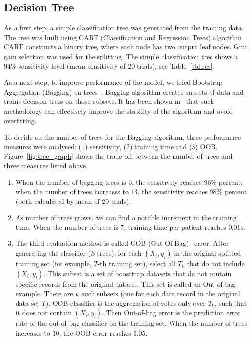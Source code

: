 \subsection{Decision Tree}
\label{sec:tree}

As a first step, a simple classification tree was generated from the 
training data. 
The tree was built using CART (Classification and Regression Trees) 
algorithm~\cite{CART}. 
CART constructs a binary tree, where each node has two output leaf 
nodes. 
Gini gain selection was used for the splitting. 
The simple classification tree shows a $94\%$ sensitivity level 
(mean sensitivity of 20 trials), see Table~\ref{tbl:res}.

As a next step, to improve performance of the model, we tried 
Bootstrap Aggregation (Bagging) on trees~\cite{BAGGING}. 
Bagging algorithm creates subsets of data and trains decision trees 
on those subsets. 
It has been shown in~\cite{BAGGING} that such methodology can 
effectively improve the stability of the algorithm and avoid 
overfitting.


To decide on the number of trees for the Bagging algorithm, three 
performance measures were analysed: (1) sensitivity, (2) training 
time and (3) OOB. Figure~\ref{fig:tree_graph} shows the trade-off 
between the number of trees and three measures listed above.

\begin{enumerate}
	\item When the number of bagging trees is $3$, the sensitivity 
	reaches $96\%$ percent; when 
	the number of trees increases to $13$, the sensitivity reaches 
	$98\%$ percent (both calculated by mean of 20 trials).
	\item 
	As number of trees grows, we can find a 
	notable increment in the training time. When the number of 
	trees is $7$, training time per patient reaches $0.01$s.
	\item The third evaluation method is called OOB 
	(Out-Of-Bag)~\cite{OOB} error. 
	After generating the classifier ($S$ trees), for each $(X_i, 
	y_i)$ in the original splitted training set (for example, $T$-th 
	training set), select all $T_k$ that do not include $(X_i, y_i)$. 
	This subset is a set of boosttrap datasets that do not contain 
	specific records from the original dataset. 
	This set is called an Out-of-bag example. 
	There are $n$ such subsets (one for each data record in the 
	original data set $T$). OOB classifier is the aggregation of 
	votes only over $T_k$, such that it does not contain $(X_i,y_i)$. 
	Then Out-of-bag error is the prediction error rate of the 
	out-of-bag classifier on the training 
	set. When the number of trees increases to $10$, the OOB error 
	reaches $0.05$.
\end{enumerate}

